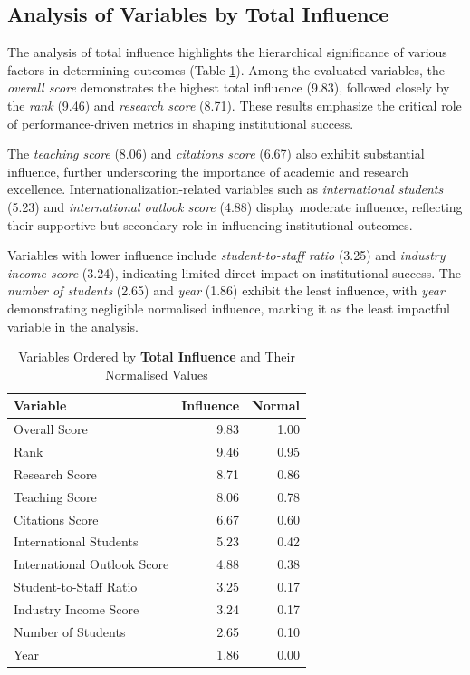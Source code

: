 \documentclass[sigconf]{acmart}
\begin{document}
\subsection{Analysis of Variables by Total Influence}

The analysis of total influence highlights the hierarchical significance of various factors in determining outcomes (Table \ref{tab:total_influence}). Among the evaluated variables, the \textit{overall score} demonstrates the highest total influence (9.83), followed closely by the \textit{rank} (9.46) and \textit{research score} (8.71). These results emphasize the critical role of performance-driven metrics in shaping institutional success.

The \textit{teaching score} (8.06) and \textit{citations score} (6.67) also exhibit substantial influence, further underscoring the importance of academic and research excellence. Internationalization-related variables such as \textit{international students} (5.23) and \textit{international outlook score} (4.88) display moderate influence, reflecting their supportive but secondary role in influencing institutional outcomes.

Variables with lower influence include \textit{student-to-staff ratio} (3.25) and \textit{industry income score} (3.24), indicating limited direct impact on institutional success. The \textit{number of students} (2.65) and \textit{year} (1.86) exhibit the least influence, with \textit{year} demonstrating negligible normalised influence, marking it as the least impactful variable in the analysis.

\begin{table}[h!]
	\centering
	\caption{Variables Ordered by \textbf{Total Influence} and Their Normalised Values}
	\label{tab:total_influence}
	\begin{tabular}{|l|r|r|}
		\hline
		\textbf{Variable} & \textbf{Influence} & \textbf{Normal} \\
		\hline
		Overall Score & 9.83 & 1.00 \\
		Rank & 9.46 & 0.95 \\
		Research Score & 8.71 & 0.86 \\
		Teaching Score & 8.06 & 0.78 \\
		Citations Score & 6.67 & 0.60 \\
		International Students & 5.23 & 0.42 \\
		International Outlook Score & 4.88 & 0.38 \\
		Student-to-Staff Ratio & 3.25 & 0.17 \\
		Industry Income Score & 3.24 & 0.17 \\
		Number of Students & 2.65 & 0.10 \\
		Year & 1.86 & 0.00 \\
		\hline
	\end{tabular}
\end{table}
\end{document}
